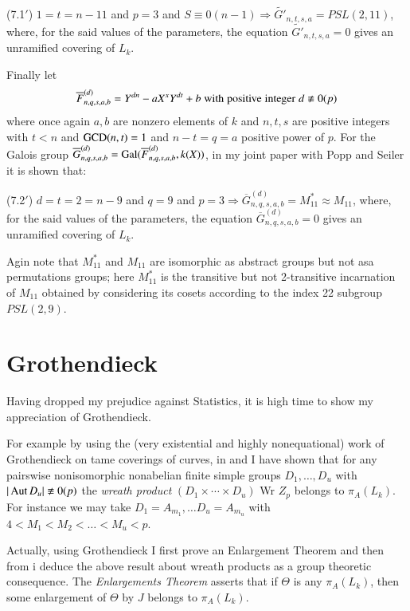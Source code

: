 (7.1$'$) $1=t=n-11$ and $p=3$ and $S\equiv 0(n-1) \Rightarrow \widetilde{G'}_{n,t,s,a} = PSL(2,11)$, where, for the said values of the parameters, the equation $ \widetilde{G'}_{n,t,s,a}=0$ gives an unramified covering of $L_{k}$.

Finally let
$$
\overline{F}^{(d)}_{n,q,s,a,b} = Y^{dn}-aX^{x}Y^{dt} + b\; {\rm with\; positive\; integer}\; d\nequiv 0(p)
$$ 
where once again $a,b$ are nonzero elements of $k$ and $n,t,s$ are positive integers with $t<n$ and $\operatorname{GCD}(n,t)=1$ and
$n-t=q=a$ positive power of $p$. For the Galois group $\overline{G}^{(d)}_{n,q,s,a,b} = \operatorname{Gal}(\overline{F}^{(d)}_{n,q,s,a,b}, k(X))$, in my joint paper \cite{art1-key15} with Popp and Seiler it is shown that:

(7.2$'$) $d=t=2=n-9$ and $q=9$ and $p=3 \Rightarrow \overline{G}^{(d)}_{n,q,s,a,b} =M^{*}_{11}\approx M_{11}$, where, for the said values of the parameters, the equation  $\overline{G}^{(d)}_{n,q,s,a,b} = 0$ gives an unramified covering of $L_{k}$.

Agin note that $M^{*}_{11}$ and $M_{11}$ are isomorphic as abstract groups but not asa permutations groups; here $M^{*}_{11}$ is the transitive but not 2-transitive incarnation of $M_{11}$ obtained by considering its cosets according to the index 22 subgroup $PSL(2,9)$.

\section{Grothendieck}

Having dropped my prejudice against Statistics, it is high time to show my appreciation of Grothendieck.

For example by using the (very existential and highly nonequational) work of Grothendieck \cite{art1-key33} on tame coverings of curves, in \cite{art1-key7} and \cite{art1-key11} I have shown that for any pairswise nonisomorphic nonabelian finite simple groups $D_{1},\ldots, D_{u}$ with $|\Aut D_{u}| \nequiv 0(p)$ the \textit{wreath product} $(D_{1}\times\cdots\times D_{u})$ Wr $Z_{p}$ belongs to $\pi_{A}(L_{k})$. For instance we may take $D_{1}= A_{m_{1}}, \ldots D_{u} =A_{m_{u}}$ with $4 < M_{1} < M_{2} < \ldots < M_{u} < p$. 

Actually, using Grothendieck \cite{art1-key33} I first prove an Enlargement Theorem and then from i deduce the above result about wreath products as a group theoretic consequence. The \textit{Enlargements Theorem} asserts that if $\Theta$ is any $\pi_{A}(L_{k})$, then some enlargement of $\Theta$ by $J$ belongs to $\pi_{A}(L_{k})$. 

